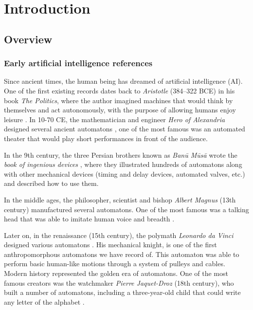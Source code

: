 
\chapter{Introduction} \label{ch:introduction}

\section{Overview}

\subsection{Early artificial intelligence references}

Since ancient times, the human being has dreamed of artificial intelligence (AI). One of the first existing records dates back to \textit{Aristotle} (384–322 BCE) in his book \textit{The Politics}, where the author imagined machines that would think by themselves and act autonomously, with the purpose of allowing humans enjoy leisure \autocite{nils2009}. In 10-70 CE, the mathematician and engineer \textit{Hero of Alexandria} designed several ancient automatons \autocite{greenwood1851}, one of the most famous was an automated theater that would play short performances in front of the audience.

In the 9th century, the three Persian brothers known as \textit{Banū Mūsā} wrote the \textit{book of ingenious devices} \autocite{musa1978}, where they illustrated hundreds of automatons along with other mechanical devices (timing and delay devices, automated valves, etc.) and described how to use them. 

In the middle ages, the philosopher, scientist and bishop \textit{Albert Magnus} (13th century) manufactured several automatons. One of the most famous was a talking head that was able to imitate human voice and breadth \autocite{worthies1828}.

Later on, in the renaissance (15th century), the polymath \textit{Leonardo da Vinci} designed various automatons \autocite{nils2009}. His mechanical knight, is one of the first anthropomorphous automatons we have record of. This automaton was able to perform basic human-like motions through a system of pulleys and cables. 
Modern history represented the golden era of automatons. One of the most famous creators was the watchmaker \textit{Pierre Jaquet-Droz} (18th century), who built a number of automatons, including a three-year-old child that could write any letter of the alphabet \autocite{carrera1979}.

